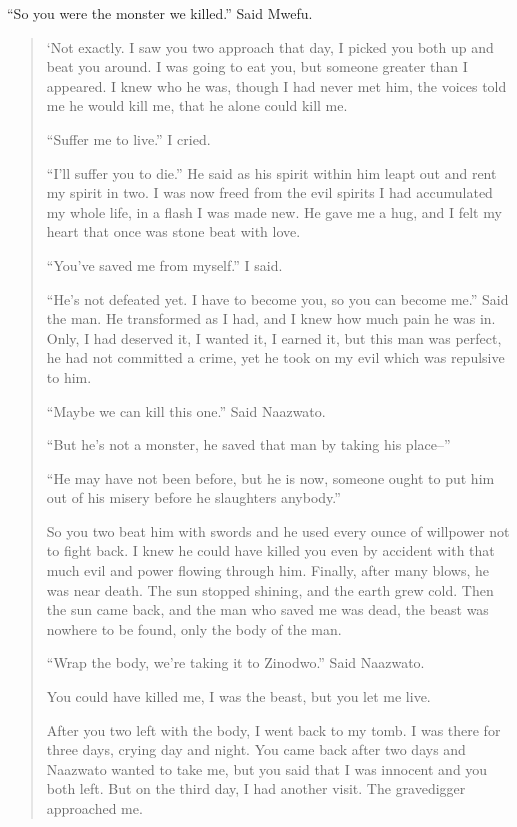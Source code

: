 ``So you were the monster we killed.'' Said Mwefu.

\begin{quote}
`Not exactly. I saw you two approach that day, I picked you both up and beat you around. I was going to eat you, but someone greater than I appeared. I knew who he was, though I had never met him, the voices told me he would kill me, that he alone could kill me.

``Suffer me to live.'' I cried.

``I'll suffer you to die.'' He said as his spirit within him leapt out and rent my spirit in two. I was now freed from the evil spirits I had accumulated my whole life, in a flash I was made new. He gave me a hug, and I felt my heart that once was stone beat with love.

``You've saved me from myself.'' I said.

``He's not defeated yet. I have to become you, so you can become me.'' Said the man.
He transformed as I had, and I knew how much pain he was in.
Only, I had deserved it, I wanted it, I earned it, but this man was perfect, he had not committed a crime, yet he took on my evil which was repulsive to him.

``Maybe we can kill this one.'' Said Naazwato.

``But he's not a monster, he saved that man by taking his place--''

``He may have not been before, but he is now, someone ought to put him out of his misery before he slaughters anybody.''

So you two beat him with swords and he used every ounce of willpower not to fight back.
I knew he could have killed you even by accident with that much evil and power flowing through him.
Finally, after many blows, he was near death.
The sun stopped shining, and the earth grew cold.
Then the sun came back, and the man who saved me was dead, the beast was nowhere to be found, only the body of the man.

``Wrap the body, we're taking it to Zinodwo.'' Said Naazwato.

You could have killed me, I was the beast, but you let me live.

After you two left with the body, I went back to my tomb.
I was there for three days, crying day and night.
You came back after two days and Naazwato wanted to take me, but you said that I was innocent and you both left. But on the third day, I had another visit.
The gravedigger approached me.


\end{quote}
